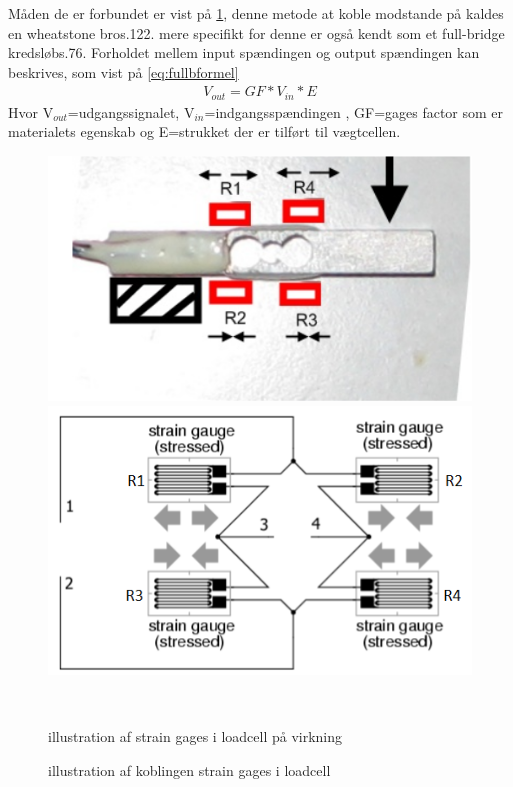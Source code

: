  Måden de er forbundet er vist på \ref{fig:loadcell2}, denne metode at koble modstande på kaldes en wheatstone bro\citep{ELengbog}{s.122}. mere specifikt for denne er også kendt som et full-bridge kredsløb\citep{AETbog}{s.76}. Forholdet mellem input spændingen og output spændingen kan beskrives, som vist på \ref{eq:fullbformel}
\begin{align}
 V_{out}=GF*V_{in}*E
 \label{eq:fullbformel}
 \end{align}
 Hvor V$_{out}$=udgangssignalet, V$_{in}$=indgangsspændingen , GF=gages factor som er materialets egenskab og E=strukket der er tilført til vægtcellen.

\begin{figure}[htbp] \centering
\begin{minipage}[b]{0.48\textwidth} \centering
\includegraphics[width=1.00\textwidth]{billeder/Hardware/loadcell1.PNG} %
\end{minipage} \hfill
\begin{minipage}[b]{0.48\textwidth} \centering
\includegraphics[width=1.00\textwidth]{billeder/Hardware/straingages2.PNG} %
\end{minipage} \\ %
\begin{minipage}[t]{0.48\textwidth}
\caption{illustration af strain gages i loadcell på virkning} %
\label{fig:Loadcell1}
\end{minipage} \hfill
\begin{minipage}[t]{0.48\textwidth}
\caption{illustration af koblingen strain gages i loadcell} %
\label{fig:loadcell2}
\end{minipage}
\end{figure}
